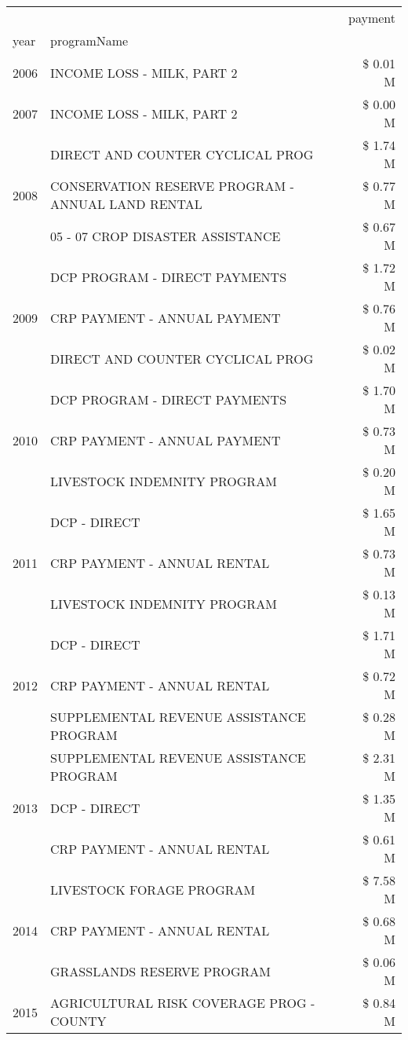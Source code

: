 \begin{tabular}{llr}
\toprule
 &  & payment \\
year & programName &  \\
\midrule
2006 & INCOME LOSS - MILK, PART 2 & \$ 0.01 M \\
\cline{1-3}
2007 & INCOME LOSS - MILK, PART 2 & \$ 0.00 M \\
\cline{1-3}
\multirow[t]{3}{*}{2008} & DIRECT AND COUNTER CYCLICAL PROG & \$ 1.74 M \\
 & CONSERVATION RESERVE PROGRAM - ANNUAL LAND RENTAL & \$ 0.77 M \\
 & 05 - 07 CROP DISASTER ASSISTANCE & \$ 0.67 M \\
\cline{1-3}
\multirow[t]{3}{*}{2009} & DCP PROGRAM - DIRECT PAYMENTS & \$ 1.72 M \\
 & CRP PAYMENT - ANNUAL PAYMENT & \$ 0.76 M \\
 & DIRECT AND COUNTER CYCLICAL PROG & \$ 0.02 M \\
\cline{1-3}
\multirow[t]{3}{*}{2010} & DCP PROGRAM - DIRECT PAYMENTS & \$ 1.70 M \\
 & CRP PAYMENT - ANNUAL PAYMENT & \$ 0.73 M \\
 & LIVESTOCK INDEMNITY PROGRAM & \$ 0.20 M \\
\cline{1-3}
\multirow[t]{3}{*}{2011} & DCP - DIRECT & \$ 1.65 M \\
 & CRP PAYMENT - ANNUAL RENTAL & \$ 0.73 M \\
 & LIVESTOCK INDEMNITY PROGRAM & \$ 0.13 M \\
\cline{1-3}
\multirow[t]{3}{*}{2012} & DCP - DIRECT & \$ 1.71 M \\
 & CRP PAYMENT - ANNUAL RENTAL & \$ 0.72 M \\
 & SUPPLEMENTAL REVENUE ASSISTANCE PROGRAM & \$ 0.28 M \\
\cline{1-3}
\multirow[t]{3}{*}{2013} & SUPPLEMENTAL REVENUE ASSISTANCE PROGRAM & \$ 2.31 M \\
 & DCP - DIRECT & \$ 1.35 M \\
 & CRP PAYMENT - ANNUAL RENTAL & \$ 0.61 M \\
\cline{1-3}
\multirow[t]{3}{*}{2014} & LIVESTOCK FORAGE PROGRAM & \$ 7.58 M \\
 & CRP PAYMENT - ANNUAL RENTAL & \$ 0.68 M \\
 & GRASSLANDS RESERVE PROGRAM & \$ 0.06 M \\
\cline{1-3}
\multirow[t]{3}{*}{2015} & AGRICULTURAL RISK COVERAGE PROG - COUNTY & \$ 0.84 M \\

\end{tabular}
